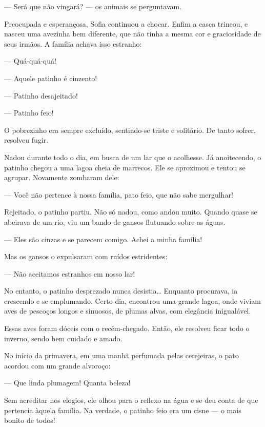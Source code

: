 \begin{conteudo}
\begin{conteudo}
\begin{conteudo}
\begin{conteudo}
\begin{conteudo}
\begin{myquote}
--- Será que não vingará? --- os animais se perguntavam.

Preocupada e esperançosa, Sofia continuou a chocar. Enfim a casca
trincou, e nasceu uma avezinha bem diferente, que não tinha a mesma cor
e graciosidade de seus irmãos. A família achava isso estranho:

--- Quá-quá-quá!

--- Aquele patinho é cinzento!

--- Patinho desajeitado!

--- Patinho feio!

O pobrezinho era sempre excluído, sentindo-se triste e solitário. De
tanto sofrer, resolveu fugir.

Nadou durante todo o dia, em busca de um lar que o acolhesse. Já
anoitecendo, o patinho chegou a uma lagoa cheia de marrecos. Ele se
aproximou e tentou se agrupar. Novamente zombaram dele:

--- Você não pertence à nossa família, pato feio, que não sabe mergulhar!

Rejeitado, o patinho partiu. Não só nadou, como andou muito. Quando
quase se abeirava de um rio, viu um bando de gansos flutuando sobre as
águas.

--- Eles são cinzas e se parecem comigo. Achei a minha família!

Mas os gansos o expulsaram com ruídos estridentes:

--- Não aceitamos estranhos em nosso lar!

No entanto, o patinho desprezado nunca desistia\ldots{} Enquanto procurava,
ia crescendo e se emplumando. Certo dia, encontrou uma grande lagoa,
onde viviam aves de pescoços longos e sinuosos, de plumas alvas, com
elegância inigualável.

Essas aves foram dóceis com o recém-chegado. Então, ele resolveu ficar
todo o inverno, sendo bem cuidado e amado.

No início da primavera, em uma manhã perfumada pelas cerejeiras, o pato
acordou com um grande alvoroço:

--- Que linda plumagem! Quanta beleza!

Sem acreditar nos elogios, ele olhou para o reflexo na água e se deu
conta de que pertencia àquela família. Na verdade, o patinho feio era um
cisne --- o mais bonito de todos!

\end{myquote}


\end{conteudo}
\end{conteudo}
\end{conteudo}
\end{conteudo}
\end{conteudo}
